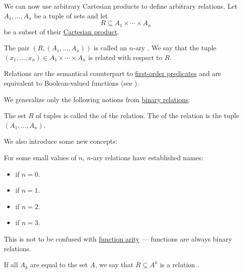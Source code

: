 \begin{definition}\label{def:relation}
  We can now use arbitrary Cartesian products to define arbitrary relations. Let \( A_1, \ldots, A_n \) be a tuple of sets and let
  \begin{equation*}
    R \subseteq A_1 \times \cdots \times A_n
  \end{equation*}
  be a subset of their \hyperref[def:cartesian_product]{Cartesian product}.

  The pair \( (R,  (A_1, \ldots, A_n)) \) is called an \( n \)-ary . We say that the tuple \( (x_1, \ldots, x_n) \in A_1 \times \cdots \times A_n \) is related with respect to \( R \).

  Relations are the semantical counterpart to \hyperref[def:first_order_structure/interpretation/predicate]{first-order predicates} and are equivalent to Boolean-valued functions (see ).

  We generalize only the following notions from \hyperref[def:binary_relation]{binary relations}:
  \begin{thmenum}[series=def:relation]
     The set \( R \) of tuples is called the  of the relation.
     The  of the relation is the tuple \( (A_1, \ldots, A_n) \).
  \end{thmenum}

  We also introduce some new concepts:
  \begin{thmenum}[resume=def:relation]
     For some small values of \( n \), \( n \)-ary relations have established names:
    \begin{itemize}
      \item {} if \( n = 0 \).
      \item {} if \( n = 1 \).
      \item {} if \( n = 2 \).
      \item {} if \( n = 3 \).
    \end{itemize}

    This is not to be confused with \hyperref[def:function_arity]{function arity} --- functions are always binary relations.

     If all \( A_k \) are equal to the set \( A \), we say that \( R \subseteq A^k \) is a relation .
  \end{thmenum}
\end{definition}

